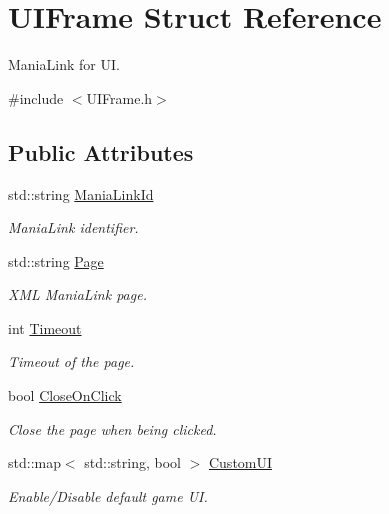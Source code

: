 \hypertarget{structUIFrame}{\section{U\-I\-Frame Struct Reference}
\label{structUIFrame}
}


Mania\-Link for U\-I.  




{\ttfamily \#include $<$U\-I\-Frame.\-h$>$}

\subsection*{Public Attributes}
\begin{DoxyCompactItemize}
\item 
\hypertarget{structUIFrame_a19acdca83f6f8e83337ee9cbc9af3d29}{std\-::string \hyperlink{structUIFrame_a19acdca83f6f8e83337ee9cbc9af3d29}{Mania\-Link\-Id}}\label{structUIFrame_a19acdca83f6f8e83337ee9cbc9af3d29}

\begin{DoxyCompactList}\small\item\em Mania\-Link identifier. \end{DoxyCompactList}\item 
\hypertarget{structUIFrame_a54d853cff6d85507611f0d43a4956ff9}{std\-::string \hyperlink{structUIFrame_a54d853cff6d85507611f0d43a4956ff9}{Page}}\label{structUIFrame_a54d853cff6d85507611f0d43a4956ff9}

\begin{DoxyCompactList}\small\item\em X\-M\-L Mania\-Link page. \end{DoxyCompactList}\item 
\hypertarget{structUIFrame_a5f0ee21f4abbec9a745a2a601e03cd8d}{int \hyperlink{structUIFrame_a5f0ee21f4abbec9a745a2a601e03cd8d}{Timeout}}\label{structUIFrame_a5f0ee21f4abbec9a745a2a601e03cd8d}

\begin{DoxyCompactList}\small\item\em Timeout of the page. \end{DoxyCompactList}\item 
\hypertarget{structUIFrame_a96c8c5d8129595ee565039a84a928ae7}{bool \hyperlink{structUIFrame_a96c8c5d8129595ee565039a84a928ae7}{Close\-On\-Click}}\label{structUIFrame_a96c8c5d8129595ee565039a84a928ae7}

\begin{DoxyCompactList}\small\item\em Close the page when being clicked. \end{DoxyCompactList}\item 
\hypertarget{structUIFrame_ad7cffba86e4d81aa7a1b7ab475233e08}{std\-::map$<$ std\-::string, bool $>$ \hyperlink{structUIFrame_ad7cffba86e4d81aa7a1b7ab475233e08}{Custom\-U\-I}}\label{structUIFrame_ad7cffba86e4d81aa7a1b7ab475233e08}

\begin{DoxyCompactList}\small\item\em Enable/\-Disable default game U\-I. \end{DoxyCompactList}\end{DoxyCompactItemize}


